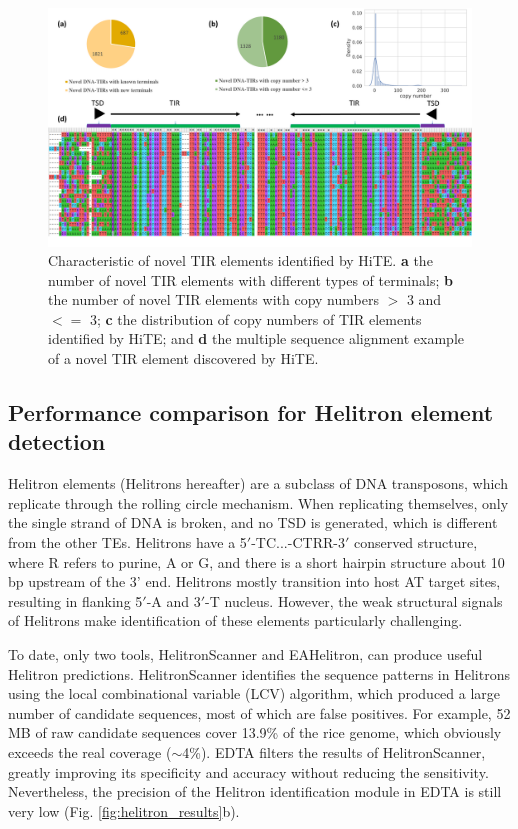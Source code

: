 \documentclass{bmcart}
\begin{document}
\begin{figure}[h!]
	\centerline{\includegraphics[width=1.0\textwidth]{figures/NovelTIRs.pdf}}
	\caption{Characteristic of novel TIR elements identified by HiTE. \textbf{a} the number of novel TIR elements with different types of terminals; \textbf{b} the number of novel TIR elements with copy numbers $>$ 3 and $<=$ 3; \textbf{c} the distribution of copy numbers of TIR elements identified by HiTE; and \textbf{d} the multiple sequence alignment example of a novel TIR element discovered by HiTE.}
	\label{fig:novel_tirs}
\end{figure}

\subsection*{Performance comparison for Helitron element detection}
Helitron elements (Helitrons hereafter) are a subclass of DNA transposons, which replicate through the rolling circle mechanism. When replicating themselves, only the single strand of DNA is broken, and no TSD is generated, which is different from the other TEs. Helitrons have a 5$'$-TC...-CTRR-3$'$ conserved structure, where R refers to purine, A or G, and there is a short hairpin structure about 10 bp upstream of the 3' end. Helitrons mostly transition into host AT target sites, resulting in flanking 5$'$-A and 3$'$-T nucleus\cite{kapitonov2007helitrons}. However, the weak structural signals of Helitrons make identification of these elements particularly challenging.

To date, only two tools, HelitronScanner and EAHelitron, can produce useful Helitron predictions. HelitronScanner identifies the sequence patterns in Helitrons using the local combinational variable (LCV) algorithm, which produced a large number of candidate sequences, most of which are false positives. For example, 52 MB of raw candidate sequences cover 13.9\% of the rice genome, which obviously exceeds the real coverage ($\sim$4\%). EDTA filters the results of HelitronScanner, greatly improving its specificity and accuracy without reducing the sensitivity\cite{ou2019benchmarking}. Nevertheless, the precision of the Helitron identification module in EDTA is still very low (Fig. \ref{fig:helitron_results}b).
\end{document}
